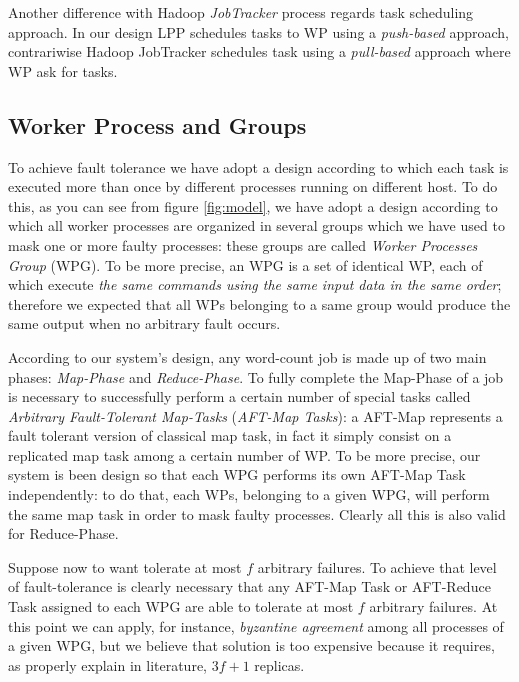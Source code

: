 \documentclass[sigchi]{acmart}
\begin{document}
Another difference with Hadoop \textit{JobTracker} process regards task scheduling approach. In our design LPP schedules tasks to WP using a \textit{push-based} approach, contrariwise Hadoop JobTracker schedules task using a \textit{pull-based} approach where WP ask for tasks\cite{LARTS}.

\subsection{Worker Process and Groups}

To achieve fault tolerance we have adopt a design according to which each task is executed more than once by different processes running on different host. To do this, as you can see from figure \ref{fig:model}, we have adopt a design according to which all worker processes are organized in several groups which we have used to mask one or more faulty processes: these groups are called \textit{Worker Processes Group} (WPG). To be more precise, an WPG is a set of identical WP, each of which execute \textit{the same commands using the same input data in the same order}; therefore we expected that all WPs belonging to a same group would produce the same output when no arbitrary fault occurs. 

According to our system's design, any word-count job is made up of two main phases: \textit{Map-Phase} and \textit{Reduce-Phase}. To fully complete the Map-Phase of a job is necessary to successfully perform a certain number of special tasks called \textit{Arbitrary Fault-Tolerant Map-Tasks} (\textit{AFT-Map Tasks}): a AFT-Map represents a fault tolerant version of classical map task, in fact it simply consist on a replicated map task among a certain number of WP. To be more precise, our system is been design so that each WPG performs its own AFT-Map Task independently: to do that, each WPs, belonging to a given WPG, will perform the same map task in order to mask faulty processes. Clearly all this is also valid for Reduce-Phase.

Suppose now to want tolerate at most $f$ arbitrary failures. To achieve that level of fault-tolerance is clearly necessary that any AFT-Map Task or AFT-Reduce Task assigned to each WPG are able to tolerate at most $f$ arbitrary failures. At this point we can apply, for instance, \textit{byzantine agreement} among all processes of a given WPG, but we believe that solution is too expensive because it requires, as properly explain in literature\citep{SDCC}, $3f + 1$ replicas.
\end{document}
